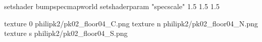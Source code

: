 setshader bumpspecmapworld
setshaderparam "specscale" 1.5 1.5 1.5

texture 0 philipk2/pk02_floor04_C.png
texture n philipk2/pk02_floor04_N.png
texture s philipk2/pk02_floor04_S.png

